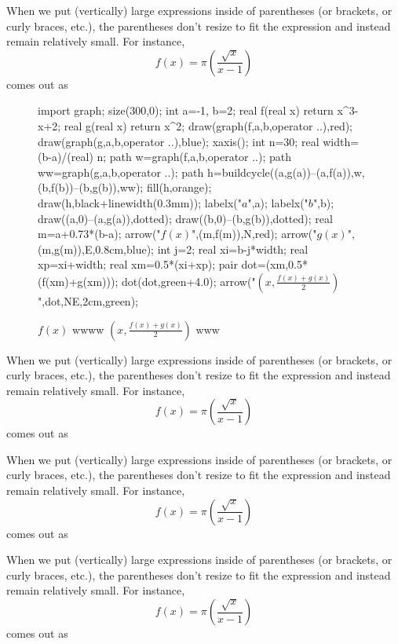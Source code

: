 \documentclass[]{article}
\begin{document}
When we put (vertically) large expressions inside of parentheses (or brackets, or curly braces, etc.), the parentheses don't resize to fit the expression and instead remain relatively small. For instance, $$f(x) = \pi(\frac{\sqrt{x}}{x-1})$$ comes out as





\begin{figure}[!ht]
	\centering
	\begin{asy}
	import graph;
	size(300,0);
	int a=-1, b=2;
	real f(real x) {return x^3-x+2;}
	real g(real x) {return x^2;}
	draw(graph(f,a,b,operator ..),red);
	draw(graph(g,a,b,operator ..),blue);
	xaxis();
	int n=30;
	real width=(b-a)/(real) n;
	path w=graph(f,a,b,operator ..);
	path ww=graph(g,a,b,operator ..);
	path h=buildcycle((a,g(a))--(a,f(a)),w,(b,f(b))--(b,g(b)),ww);
	fill(h,orange);
	draw(h,black+linewidth(0.3mm));
	labelx("$a$",a);
	labelx("$b$",b);
	draw((a,0)--(a,g(a)),dotted);
	draw((b,0)--(b,g(b)),dotted);
	real m=a+0.73*(b-a);
	arrow("$f(x)$",(m,f(m)),N,red);
	arrow("$g(x)$",(m,g(m)),E,0.8cm,blue);
	int j=2;
	real xi=b-j*width;
	real xp=xi+width;
	real xm=0.5*(xi+xp);
	pair dot=(xm,0.5*(f(xm)+g(xm)));
	dot(dot,green+4.0);
	arrow("$\left(x,\frac{f(x)+g(x)}{2}\right)$",dot,NE,2cm,green);
	\end{asy}
	\caption{$f(x)$ wwww $\left(x,\frac{f(x)+g(x)}{2}\right)$ www}
\end{figure}


When we put (vertically) large expressions inside of parentheses (or brackets, or curly braces, etc.), the parentheses don't resize to fit the expression and instead remain relatively small. For instance, $$f(x) = \pi(\frac{\sqrt{x}}{x-1})$$ comes out as

When we put (vertically) large expressions inside of parentheses (or brackets, or curly braces, etc.), the parentheses don't resize to fit the expression and instead remain relatively small. For instance, $$f(x) = \pi(\frac{\sqrt{x}}{x-1})$$ comes out as

When we put (vertically) large expressions inside of parentheses (or brackets, or curly braces, etc.), the parentheses don't resize to fit the expression and instead remain relatively small. For instance, $$f(x) = \pi(\frac{\sqrt{x}}{x-1})$$ comes out as
\end{document}
